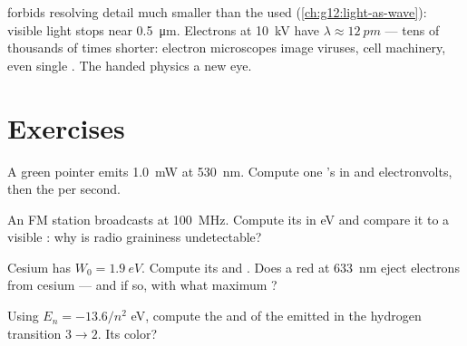 \begin{example}\label{ex:g12:quantum-world:microscope}
 forbids resolving detail much smaller than the  used
(\cref{ch:g12:light-as-wave}): visible light stops near \qty{0.5}{\micro m}.
Electrons at \qty{10}{kV} have $\lambda \approx \qty{12}{pm}$ --- tens of
thousands of times shorter: electron microscopes image viruses, cell
machinery, even single . The  handed physics a new eye.
\end{example}

\section{Exercises}

\begin{exercise}[$\star$]\label{exo:g12:quantum-world:1}
A green  pointer emits \qty{1.0}{mW} at \qty{530}{nm}. Compute one
's  in  and electronvolts, then the  per second.
\end{exercise}

\begin{exercise}[$\star$]\label{exo:g12:quantum-world:2}
An FM station broadcasts at \qty{100}{MHz}. Compute its   in
\unit{eV} and compare it to a visible : why is radio graininess undetectable?
\end{exercise}

\begin{exercise}[$\star$]\label{exo:g12:quantum-world:3}
Cesium has $W_0 = \qty{1.9}{eV}$. Compute its  and
. Does a red  at \qty{633}{nm} eject electrons from cesium ---
and if so, with what maximum ?
\end{exercise}

\begin{exercise}[$\star$]\label{exo:g12:quantum-world:4}
Using $E_n = -13.6/n^2$ \unit{eV}, compute the  and  of
the  emitted in the hydrogen transition $3 \to 2$. Its color?
\end{exercise}

